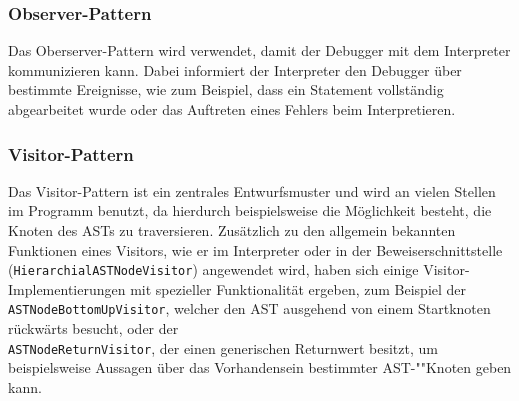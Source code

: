 \subsubsection{Observer-Pattern}
Das Oberserver-Pattern wird verwendet, damit der Debugger mit dem Interpreter kommunizieren kann. Dabei informiert der Interpreter den Debugger über bestimmte Ereignisse, wie zum Beispiel, dass ein Statement vollständig abgearbeitet wurde oder das Auftreten eines Fehlers beim Interpretieren. 

\subsubsection{Visitor-Pattern}
Das Visitor-Pattern ist ein zentrales Entwurfsmuster und wird an vielen Stellen im Programm benutzt, da hierdurch beispielsweise die Möglichkeit besteht, die Knoten des ASTs zu traversieren. Zusätzlich zu den allgemein bekannten Funktionen eines Visitors, wie er im Interpreter oder in der Beweiserschnittstelle \\(\texttt{HierarchialASTNodeVisitor}) angewendet wird, haben sich einige Visitor-Implementierungen mit spezieller Funktionalität ergeben, zum Beispiel der \texttt{ASTNodeBottomUpVisitor}, welcher den AST ausgehend von einem Startknoten rückwärts besucht, oder der \\ \texttt{ASTNodeReturnVisitor}, der einen generischen Returnwert besitzt, um beispielsweise Aussagen über das Vorhandensein bestimmter AST-""Knoten geben kann.

